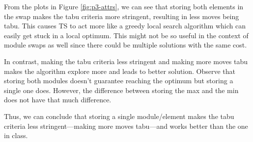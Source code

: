 From the plots in Figure \ref{fig:p3-attrs}, we can see that storing both elements in the swap makes the tabu criteria more stringent, resulting in less moves being tabu. This causes TS to act more like a greedy local search algorithm which can easily get stuck in a local optimum. This might not be so useful in the context of module swaps as well since there could be multiple solutions with the same cost.

In contrast, making the tabu criteria less stringent and making more moves tabu makes the algorithm explore more and leads to better solution. Observe that storing both modules doesn't guarantee reaching the optimum but storing a single one does. However, the difference between storing the max and the min does not have that much difference.

Thus, we can conclude that storing a single module/element makes the tabu criteria less stringent---making more moves tabu---and works better than the one in class.

